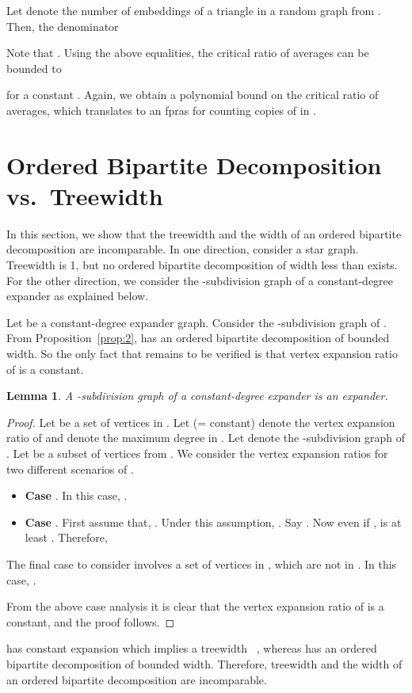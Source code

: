 \documentclass[11pt]{article}
\newtheorem{lemma}[theorem]{Lemma}
\begin{document}
Let  denote the number of embeddings of a triangle in a random graph from . Then,  the denominator  

Note that . Using the above equalities, the critical ratio of averages can be bounded to 

for a constant . Again, we obtain a polynomial bound on the critical ratio of averages, which translates to an fpras for counting copies of  in .

\section{Ordered Bipartite Decomposition vs.\ Treewidth} \label{app:treewidth}
In this section, we show that the treewidth and the width of an ordered bipartite decomposition are incomparable. In one direction, consider a star graph. Treewidth is 1, but no ordered bipartite decomposition of width less than  exists. For the other direction, we consider the -subdivision graph of a constant-degree expander as explained below. 

Let  be a constant-degree expander graph. Consider the -subdivision graph
 of  . From Proposition~\ref{prop:2},  has an ordered bipartite decomposition of bounded width. So the only fact that remains to be verified is that vertex expansion ratio of  is a constant.

\begin{lemma} \label{expand}
A -subdivision graph of a constant-degree expander is an expander. 
\end{lemma}
\begin{proof}
Let  be a set of vertices in . Let  (= constant) denote the vertex expansion ratio of  and  denote the maximum degree in . Let  denote the -subdivision graph of .  Let  be a subset of vertices from . We consider the vertex expansion ratios for two different scenarios of .  
\begin{itemize}
\item \textbf{Case }. In this case, . 
\item \textbf{Case }. First assume that, . Under this assumption, . Say . Now even if ,  is at least . Therefore,  

\end{itemize} 
The final case to consider involves a set of vertices  in , which are not in . In this case, .

From the above case analysis it is clear that the vertex expansion ratio of  is a constant, and the proof follows.
\end{proof}
 has constant expansion which implies a treewidth ~\cite{band}, whereas  has an ordered bipartite decomposition of bounded width. Therefore, treewidth and the width of an ordered bipartite decomposition are incomparable.
\end{document}
